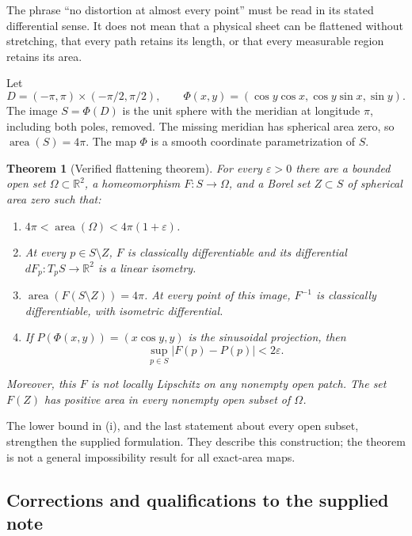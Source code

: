 \documentclass[11pt,letterpaper]{article}
\numberwithin{equation}{section}
\newtheorem{theorem}{Theorem}[section]
\theoremstyle{remark}
\newcommand{\R}{\mathbb R}
\newcommand{\area}{\operatorname{area}}
\newcommand{\eps}{\varepsilon}
\begin{document}
The phrase ``no distortion at almost every point'' must be read in its stated differential sense. It does not mean that a physical sheet can be flattened without stretching, that every path retains its length, or that every measurable region retains its area.

Let
\[
 D=(-\pi,\pi)\times(-\pi/2,\pi/2),\qquad
 \Phi(x,y)=(\cos y\cos x,\cos y\sin x,\sin y).
\]
The image $S=\Phi(D)$ is the unit sphere with the meridian at longitude $\pi$, including both poles, removed. The missing meridian has spherical area zero, so $\area(S)=4\pi$. The map $\Phi$ is a smooth coordinate parametrization of $S$.

\begin{theorem}[Verified flattening theorem]
\label{thm:main}
For every $\eps>0$ there are a bounded open set $\Omega\subset\R^2$, a homeomorphism $F:S\to\Omega$, and a Borel set $Z\subset S$ of spherical area zero such that:
\begin{enumerate}[label=(\roman*)]
\item $4\pi<\area(\Omega)<4\pi(1+\eps)$.
\item At every $p\in S\setminus Z$, $F$ is classically differentiable and its differential $dF_p:T_pS\to\R^2$ is a linear isometry.
\item $\area(F(S\setminus Z))=4\pi$. At every point of this image, $F^{-1}$ is classically differentiable, with isometric differential.
\item If $P(\Phi(x,y))=(x\cos y,y)$ is the sinusoidal projection, then
\[
 \sup_{p\in S}|F(p)-P(p)|<2\eps.
\]
\end{enumerate}
Moreover, this $F$ is not locally Lipschitz on any nonempty open patch. The set $F(Z)$ has positive area in every nonempty open subset of $\Omega$.
\end{theorem}

The lower bound in (i), and the last statement about every open subset, strengthen the supplied formulation. They describe this construction; the theorem is not a general impossibility result for all exact-area maps.

\subsection{Corrections and qualifications to the supplied note}
\end{document}
